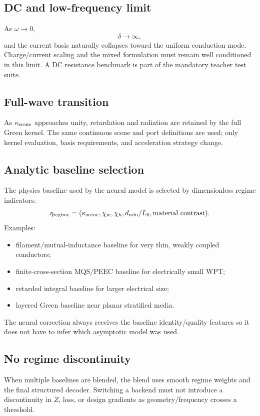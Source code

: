 \subsection{DC and low-frequency limit}

As $\omega\to0$,
\[
 \delta\to\infty,
\]
and the current basis naturally collapses toward the uniform conduction mode.
Charge/current scaling and the mixed formulation must remain well conditioned
in this limit. A DC resistance benchmark is part of the mandatory teacher test
suite.

\subsection{Full-wave transition}

As $\kappa_{\rm scene}$ approaches unity, retardation and radiation are retained
by the full Green kernel. The same continuous scene and port definitions are
used; only kernel evaluation, basis requirements, and acceleration strategy
change.

\subsection{Analytic baseline selection}

The physics baseline used by the neural model is selected by dimensionless
regime indicators:
\[
 \eta_{\rm regime}
 =
 (\kappa_{\rm scene},\chi_w,\chi_h,
  d_{\min}/L_0,\text{material contrast}).
\]
Examples:
\begin{itemize}
\item filament/mutual-inductance baseline for very thin, weakly coupled
      conductors;
\item finite-cross-section MQS/PEEC baseline for electrically small WPT;
\item retarded integral baseline for larger electrical size;
\item layered Green baseline near planar stratified media.
\end{itemize}
The neural correction always receives the baseline identity/quality features so
it does not have to infer which asymptotic model was used.

\subsection{No regime discontinuity}

When multiple baselines are blended, the blend uses smooth regime weights and
the final structured decoder. Switching a backend must not introduce a
discontinuity in $Z$, loss, or design gradients as geometry/frequency crosses a
threshold.
